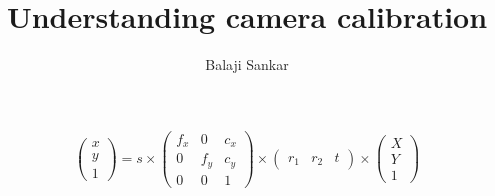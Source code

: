 \documentclass[14pt]{article}
\title{Understanding camera calibration}
\author{  Balaji Sankar    }
\begin{document}
\maketitle
\[
\left( \begin{array}{c}
x \\
y \\
1 \end{array} \right)  = s \times
 \left( \begin{array}{ccc}
f_x & 0 & c_x \\
0 & f_y & c_y \\
0 & 0 & 1 \end{array} \right) \times
\left( \begin{array}{ccc}
r_1 & r_2 & t \end{array} \right) \times
\left( \begin{array}{c}
X \\
Y \\
1 \end{array} \right)
\] 
\end{document}
